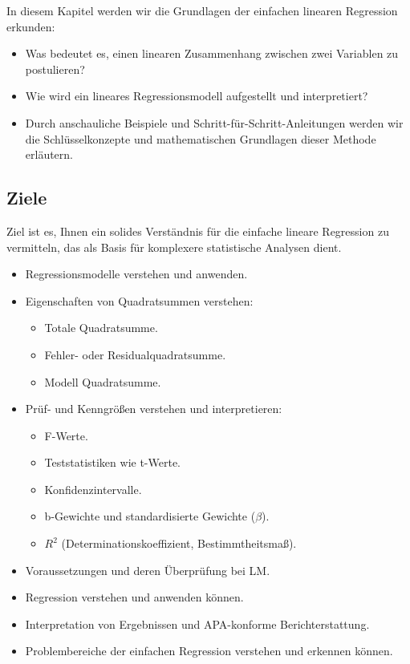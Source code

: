\documentclass[
]{article}
\providecommand{\tightlist}{%
  \setlength{\itemsep}{0pt}\setlength{\parskip}{0pt}}
\begin{document}
In diesem Kapitel werden wir die Grundlagen der einfachen linearen Regression erkunden:

\begin{itemize}
\tightlist
\item
  Was bedeutet es, einen linearen Zusammenhang zwischen zwei Variablen zu postulieren?
\item
  Wie wird ein lineares Regressionsmodell aufgestellt und interpretiert?
\item
  Durch anschauliche Beispiele und Schritt-für-Schritt-Anleitungen werden wir die Schlüsselkonzepte und mathematischen Grundlagen dieser Methode erläutern.
\end{itemize}

\subsection*{Ziele}\label{ziele}

Ziel ist es, Ihnen ein solides Verständnis für die einfache lineare Regression zu vermitteln, das als Basis für komplexere statistische Analysen dient.

\begin{itemize}
\tightlist
\item
  Regressionsmodelle verstehen und anwenden.
\item
  Eigenschaften von Quadratsummen verstehen:

  \begin{itemize}
  \tightlist
  \item
    Totale Quadratsumme.
  \item
    Fehler- oder Residualquadratsumme.
  \item
    Modell Quadratsumme.
  \end{itemize}
\item
  Prüf- und Kenngrößen verstehen und interpretieren:

  \begin{itemize}
  \tightlist
  \item
    F-Werte.
  \item
    Teststatistiken wie t-Werte.
  \item
    Konfidenzintervalle.
  \item
    b-Gewichte und standardisierte Gewichte (\(\beta\)).
  \item
    \(R^2\) (Determinationskoeffizient, Bestimmtheitsmaß).
  \end{itemize}
\item
  Voraussetzungen und deren Überprüfung bei LM.
\item
  Regression verstehen und anwenden können.
\item
  Interpretation von Ergebnissen und APA-konforme Berichterstattung.
\item
  Problembereiche der einfachen Regression verstehen und erkennen können.
\end{itemize}
\end{document}
